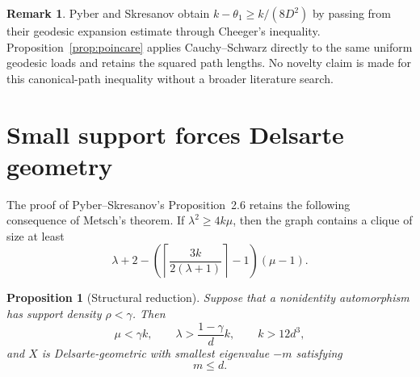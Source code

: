 \documentclass[11pt]{amsart}
\newtheorem{proposition}[theorem]{Proposition}
\theoremstyle{definition}
\newtheorem{remark}[theorem]{Remark}
\newcommand{\gam}{\gamma}
\begin{document}
\begin{remark}
Pyber and Skresanov obtain $k-\theta_1\ge k/(8D^2)$ by passing from their geodesic expansion estimate through Cheeger's inequality.  Proposition~\ref{prop:poincare} applies Cauchy--Schwarz directly to the same uniform geodesic loads and retains the squared path lengths.  No novelty claim is made for this canonical-path inequality without a broader literature search.
\end{remark}

\section{Small support forces Delsarte geometry}
The proof of Pyber--Skresanov's Proposition~2.6 retains the following consequence of Metsch's theorem.  If $\lambda^2\ge4k\mu$, then the graph contains a clique of size at least
\begin{equation}\label{eq:metsch}
  \lambda+2-
  \left(\left\lceil\frac{3k}{2(\lambda+1)}\right\rceil-1\right)(\mu-1).
\end{equation}

\begin{proposition}[Structural reduction]\label{prop:structure}
Suppose that a nonidentity automorphism has support density $\rho<\gam$.  Then
\begin{equation}\label{eq:structdata}
  \mu<\gam k,
  \qquad
  \lambda>\frac{1-\gam}{d}k,
  \qquad
  k>12d^3,
\end{equation}
and $X$ is Delsarte-geometric with smallest eigenvalue $-m$ satisfying
\begin{equation}\label{eq:mleqd}
  m\le d.
\end{equation}
\end{proposition}
\end{document}
